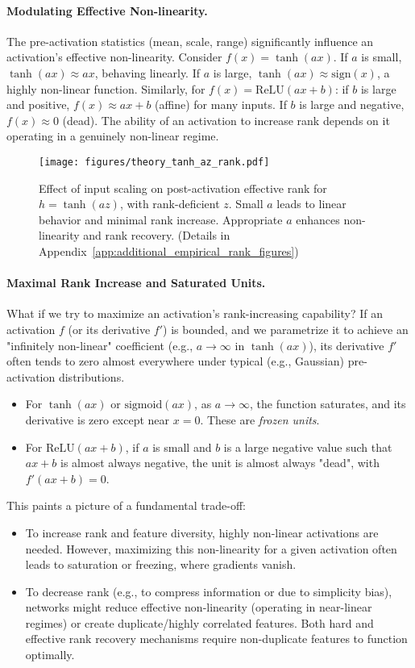 \documentclass{article}
\begin{document}
\paragraph{Modulating Effective Non-linearity.}
The pre-activation statistics (mean, scale, range) significantly influence an activation's effective non-linearity.
Consider $f(x) = \tanh(ax)$. If $a$ is small, $\tanh(ax) \approx ax$, behaving linearly. If $a$ is large, $\tanh(ax) \approx \mathrm{sign}(x)$, a highly non-linear function. Similarly, for $f(x) = \mathrm{ReLU}(ax+b)$: if $b$ is large and positive, $f(x) \approx ax+b$ (affine) for many inputs. If $b$ is large and negative, $f(x) \approx 0$ (dead).
The ability of an activation to increase rank depends on it operating in a genuinely non-linear regime.

\begin{figure}[ht!]
    \centering
    \texttt{[image: figures/theory\_tanh\_az\_rank.pdf]}
    \caption{Effect of input scaling on post-activation effective rank for $h = \tanh(az)$, with rank-deficient $z$. Small $a$ leads to linear behavior and minimal rank increase. Appropriate $a$ enhances non-linearity and rank recovery. (Details in Appendix~\ref{app:additional_empirical_rank_figures})}
    \label{fig:theory_tanh_az_rank_main}
\end{figure}

\paragraph{Maximal Rank Increase and Saturated Units.}
What if we try to maximize an activation's rank-increasing capability? If an activation $f$ (or its derivative $f'$) is bounded, and we parametrize it to achieve an "infinitely non-linear" coefficient (e.g., $a \to \infty$ in $\tanh(ax)$), its derivative $f'$ often tends to zero almost everywhere under typical (e.g., Gaussian) pre-activation distributions.
\begin{itemize}
    \item For $\tanh(ax)$ or $\mathrm{sigmoid}(ax)$, as $a \to \infty$, the function saturates, and its derivative is zero except near $x=0$. These are \emph{frozen units}.
    \item For $\mathrm{ReLU}(ax+b)$, if $a$ is small and $b$ is a large negative value such that $ax+b$ is almost always negative, the unit is almost always "dead", with $f'(ax+b)=0$.
\end{itemize}

This paints a picture of a fundamental trade-off:
\begin{itemize}
    \item To increase rank and feature diversity, highly non-linear activations are needed. However, maximizing this non-linearity for a given activation often leads to saturation or freezing, where gradients vanish.
    \item To decrease rank (e.g., to compress information or due to simplicity bias), networks might reduce effective non-linearity (operating in near-linear regimes) or create duplicate/highly correlated features. Both hard and effective rank recovery mechanisms require non-duplicate features to function optimally.
\end{itemize}
\end{document}
